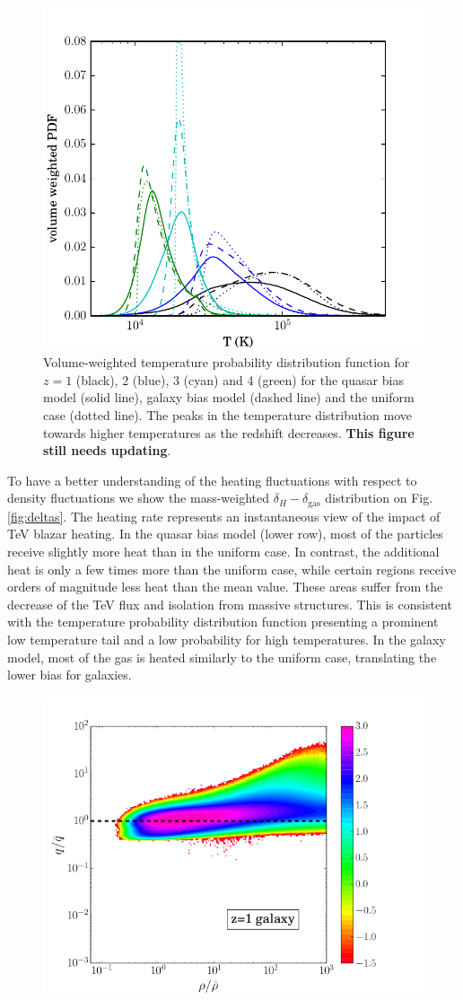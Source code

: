\documentclass[numberedappendix]{emulateapj}
\newcommand\ALc[1]{{\color{red} \bf #1}} %
\begin{document}
{\begin{figure}[h]
\centering
\includegraphics[width = .45\textwidth ]{full_PDF_256_gal_qso.pdf}
\caption{Volume-weighted temperature probability distribution function for $z=1$ (black), 2 (blue), 3 (cyan) and 4 (green) for the quasar bias model (solid line), galaxy bias model (dashed line) and the uniform case (dotted line). The peaks in the temperature distribution move towards higher temperatures as the redshift decreases.\ALc{This figure still needs updating}.}
\label{fig:PDF}
\end{figure}
To have a better understanding of the heating fluctuations with respect to density fluctuations we show the mass-weighted $\delta_H-\delta_{\mathrm{gas}}$ distribution on Fig. \ref{fig:deltas}. The heating rate represents an instantaneous view of the impact of TeV blazar heating. In the quasar bias model (lower row), most of the particles receive slightly more heat than in the uniform case. In contrast, the additional heat is only a few times more than the uniform case, while certain regions receive orders of magnitude less heat than the mean value. These areas suffer from the decrease of the TeV flux and isolation from massive structures. This is consistent with the temperature probability distribution function presenting a prominent low temperature tail and a low probability for high temperatures. In the galaxy model, most of the gas is heated similarly to the uniform case, translating the lower bias for galaxies.
\begin{figure}[h]
\centering
\includegraphics[width = .45\textwidth ]{delta_deltah_z3_gal2_ok.png}

\end{figure}}
\end{document}
